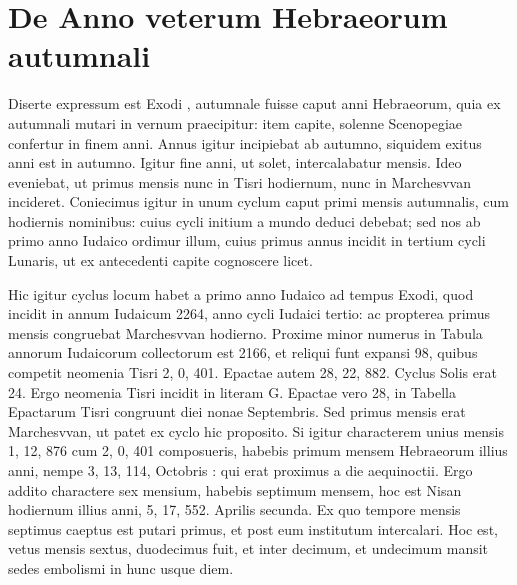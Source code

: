 \section{De Anno veterum Hebraeorum autumnali}
%
Diserte expressum est Exodi , autumnale fuisse caput anni
Hebraeorum, quia ex autumnali mutari in vernum praecipitur:
item  capite, solenne Scenopegiae confertur in finem anni.
Annus igitur incipiebat ab autumno, siquidem
exitus anni est in autumno.
Igitur fine anni, ut solet,
intercalabatur mensis.
Ideo eveniebat, ut
primus mensis nunc in Tisri hodiernum, nunc in
Marchesvvan incideret.
Coniecimus igitur in
unum cyclum caput primi mensis autumnalis,
cum hodiernis nominibus: cuius cycli initium a
mundo deduci debebat; sed nos ab primo anno Iudaico %
ordimur illum, cuius primus annus incidit
in tertium cycli Lunaris, ut ex antecedenti capite
cognoscere licet.
\begin{table}[t]

\end{table}
Hic igitur cyclus locum habet
a primo anno Iudaico ad tempus Exodi, quod incidit
in annum Iudaicum 2264, anno cycli Iudaici
tertio: ac propterea primus mensis congruebat
Marchesvvan hodierno.
Proxime minor numerus
in Tabula annorum Iudaicorum collectorum
est 2166, et reliqui funt expansi 98, quibus
competit neomenia Tisri 2, 0, 401.
%
Epactae autem 28, 22, 882.
Cyclus
Solis erat 24.
Ergo neomenia Tisri incidit in literam \textsc{G}.
Epactae
vero 28, in Tabella Epactarum Tisri congruunt diei nonae Septembris.
Sed primus mensis erat Marchesvvan, ut patet ex cyclo hic proposito.
Si igitur characterem unius mensis 1, 12, 876 cum 2, 0, 401
composueris, habebis primum mensem Hebraeorum illius anni, nempe
3, 13, 114, Octobris : qui erat proximus a die aequinoctii.
Ergo
addito charactere sex mensium, habebis septimum mensem, hoc est
Nisan hodiernum illius anni, 5, 17, 552.
Aprilis secunda.
Ex quo
tempore mensis septimus caeptus est putari primus, et post eum institutum
intercalari.
Hoc est, vetus mensis sextus, duodecimus fuit, et
inter decimum, et undecimum mansit sedes embolismi in hunc usque
diem.

